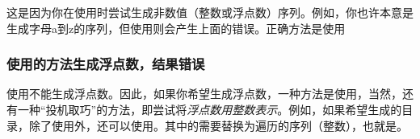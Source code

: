 这是因为你在使用时尝试生成非数值（整数或浮点数）序列。例如，你也许本意是生成字母a到z的序列，但使用则会产生上面的错误。正确方法是使用

\subsubsection{使用的方法生成浮点数，结果错误}

使用不能生成浮点数。因此，如果你希望生成浮点数，一种方法是使用，当然，还有一种“投机取巧”的方法，即尝试将\emph{浮点数用整数表示}。例如，如果希望生成的目录，除了使用外，还可以使用。其中的需要替换为遍历的序列（整数），也就是。